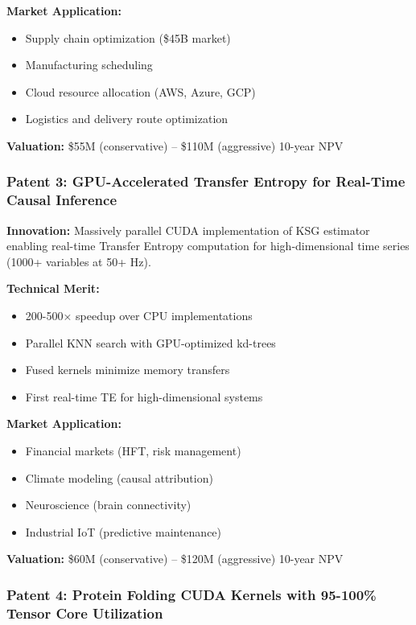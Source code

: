 \documentclass[11pt,letterpaper]{article}
\begin{document}
\textbf{Market Application:}
\begin{itemize}
    \item Supply chain optimization (\$45B market)
    \item Manufacturing scheduling
    \item Cloud resource allocation (AWS, Azure, GCP)
    \item Logistics and delivery route optimization
\end{itemize}

\textbf{Valuation:} \$55M (conservative) -- \$110M (aggressive) 10-year NPV

\subsubsection{Patent 3: GPU-Accelerated Transfer Entropy for Real-Time Causal Inference}

\textbf{Innovation:} Massively parallel CUDA implementation of KSG estimator enabling real-time Transfer Entropy computation for high-dimensional time series (1000+ variables at 50+ Hz).

\textbf{Technical Merit:}
\begin{itemize}
    \item 200-500× speedup over CPU implementations
    \item Parallel KNN search with GPU-optimized kd-trees
    \item Fused kernels minimize memory transfers
    \item First real-time TE for high-dimensional systems
\end{itemize}

\textbf{Market Application:}
\begin{itemize}
    \item Financial markets (HFT, risk management)
    \item Climate modeling (causal attribution)
    \item Neuroscience (brain connectivity)
    \item Industrial IoT (predictive maintenance)
\end{itemize}

\textbf{Valuation:} \$60M (conservative) -- \$120M (aggressive) 10-year NPV

\subsubsection{Patent 4: Protein Folding CUDA Kernels with 95-100\% Tensor Core Utilization}
\end{document}
